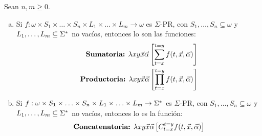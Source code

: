   \begin{lemma}
    \PN Sean $n, m \geq 0$.

    \begin{enumerate}[a)]
      \item Si $f: \omega \times S_{1} \times \dotsc \times S_{n} \times L_{1} \times \dotsc \times L_{m} \rightarrow
        \omega$ es $\Sigma$-PR, con $ S_{1}, \dotsc, S_{n} \subseteq \omega$ y $L_{1}, \dotsc, L_{m} \subseteq \Sigma^{\ast}$
        no vacíos, entonces lo son las funciones:
        \begin{eqnarray*}
          \text{\textbf{Sumatoria:} } \lambda xy\vec{x}\vec{\alpha} \left[\sum_{t=x}^{t=y} f(t,\vec{x},\vec{\alpha})
            \right] \\
          \text{\textbf{Productoria:} } \lambda xy\vec{x}\vec{\alpha} \left[\prod_{t=x}^{t=y}f(t,\vec{x},\vec{\alpha})
            \right]
        \end{eqnarray*}

      \item Si $f: \omega \times S_{1} \times \dotsc \times S_{n} \times L_{1} \times \dotsc \times L_{m} \rightarrow
        \Sigma^{\ast}$ es $\Sigma$-PR, con $ S_{1}, \dotsc, S_{n} \subseteq \omega$ y $L_{1}, \dotsc, L_{m} \subseteq \Sigma^{\ast}$
        no vacíos, entonces lo es la función:
        \[
          \text{\textbf{Concatenatoria:} } \lambda xy\vec{x}\vec{\alpha}\left[C_{t=x}^{t=y} f(t,\vec{x},\vec{\alpha})
            \right]
        \]
    \end{enumerate}
  \end{lemma}
